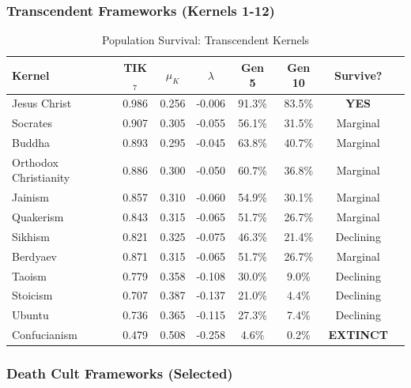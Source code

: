 \documentclass[11pt,a4paper]{article}
\theoremstyle{definition}
\theoremstyle{remark}
\begin{document}
\subsubsection{Transcendent Frameworks (Kernels 1-12)}

\begin{table}[H]
\centering
\caption{Population Survival: Transcendent Kernels}
\label{tab:pop-transcendent}
\begin{tabular}{@{}lccccccc@{}}
\toprule
\textbf{Kernel} & \textbf{TIK$_7$} & $\mu_K$ & $\lambda$ & \textbf{Gen 5} & \textbf{Gen 10} & \textbf{Survive?} \\
\midrule
Jesus Christ & 0.986 & 0.256 & -0.006 & 91.3\% & 83.5\% & \textbf{YES} \\
Socrates & 0.907 & 0.305 & -0.055 & 56.1\% & 31.5\% & Marginal \\
Buddha & 0.893 & 0.295 & -0.045 & 63.8\% & 40.7\% & Marginal \\
Orthodox Christianity & 0.886 & 0.300 & -0.050 & 60.7\% & 36.8\% & Marginal \\
Jainism & 0.857 & 0.310 & -0.060 & 54.9\% & 30.1\% & Marginal \\
Quakerism & 0.843 & 0.315 & -0.065 & 51.7\% & 26.7\% & Marginal \\
Sikhism & 0.821 & 0.325 & -0.075 & 46.3\% & 21.4\% & Declining \\
Berdyaev & 0.871 & 0.315 & -0.065 & 51.7\% & 26.7\% & Marginal \\
Taoism & 0.779 & 0.358 & -0.108 & 30.0\% & 9.0\% & Declining \\
Stoicism & 0.707 & 0.387 & -0.137 & 21.0\% & 4.4\% & Declining \\
Ubuntu & 0.736 & 0.365 & -0.115 & 27.3\% & 7.4\% & Declining \\
Confucianism & 0.479 & 0.508 & -0.258 & 4.6\% & 0.2\% & \textbf{EXTINCT} \\
\bottomrule
\end{tabular}
\end{table}

\subsubsection{Death Cult Frameworks (Selected)}
\end{document}
